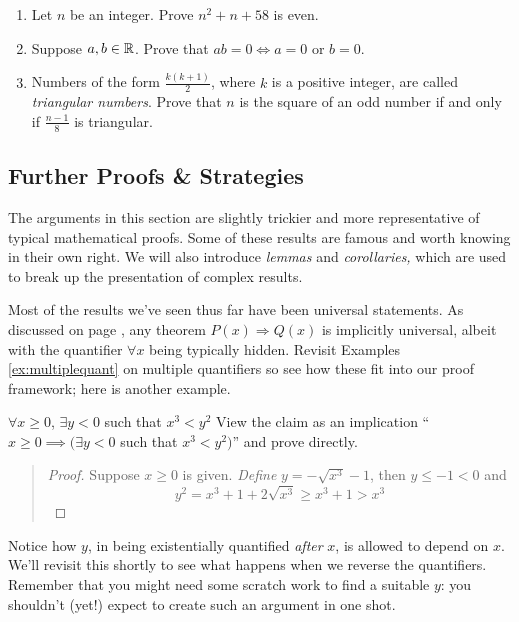 \begin{exercises}{}{}
\begin{enumerate}
    
    \item Let $n$ be an integer. Prove $n^2+n+58$ is even. 

  
		\item\label{exs:zerofactor} Suppose $a,b\in\mathbb{R}$. Prove that $ab=0\iff a=0$ or $b=0$.
  
    
    \item Numbers of the form $\frac{k(k + 1)}{2}$, where $k$ is a positive integer, are called \emph{triangular numbers}. Prove that $n$ is the square of an odd number if and only if $\frac{n-1}{8}$ is triangular.
         
	\end{enumerate}
\end{exercises}

\clearpage



\subsection{Further Proofs \& Strategies}\label{sec:proof2}


The arguments in this section are slightly trickier and more representative of typical mathematical proofs. Some of these results are famous and worth knowing in their own right. We will also introduce \emph{lemmas} and \emph{corollaries,} which are used to break up the presentation of complex results.



Most of the results we've seen thus far have been universal statements. As discussed on page \pageref{pg:univproof}, any theorem $P(x)\Longrightarrow Q(x)$ is implicitly universal, albeit with the quantifier $\forall x$ being typically hidden. Revisit Examples \ref{ex:multiplequant} on multiple quantifiers so see how these fit into our proof framework; here is another example.

\begin{example}{}{}
	$\forall x\ge 0$, $\exists y<0$ such that $x^3<y^2$\medbreak
	View the claim as an implication ``$x\ge 0\implies (\exists y<0$ such that $x^3<y^2)$'' and prove directly.
	\begin{quote}
		\begin{proof}
			Suppose $x\ge 0$ is given. \emph{Define} $y=-\sqrt{x^3}-1$, then $y\le -1<0$ and 
			\[
				y^2=x^3+1+2\sqrt{x^3}\ge x^3+1>x^3 \tag*{\qedhere}
			\]
		\end{proof}
	\end{quote}
	Notice how $y$, in being existentially quantified \emph{after} $x$, is allowed to depend on $x$. We'll revisit this shortly to see what happens when we reverse the quantifiers. Remember that you might need some scratch work to find a suitable $y$: you shouldn't (yet!) expect to create such an argument in one shot.
\end{example}

